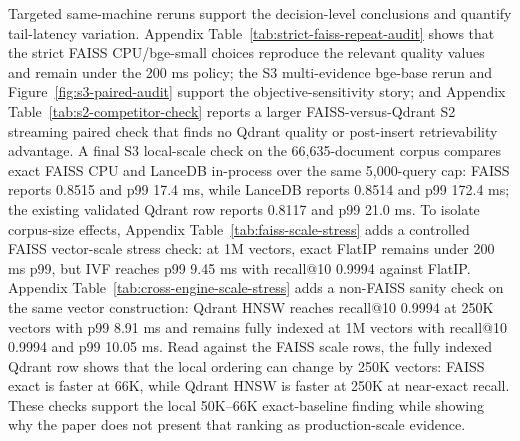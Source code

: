 Targeted same-machine reruns support the decision-level conclusions and quantify tail-latency variation. Appendix Table~\ref{tab:strict-faiss-repeat-audit} shows that the strict FAISS CPU/bge-small choices reproduce the relevant quality values and remain under the 200 ms policy; the S3 multi-evidence bge-base rerun and Figure~\ref{fig:s3-paired-audit} support the objective-sensitivity story; and Appendix Table~\ref{tab:s2-competitor-check} reports a larger FAISS-versus-Qdrant S2 streaming paired check that finds no Qdrant quality or post-insert retrievability advantage. A final S3 local-scale check on the 66{,}635-document \hotpotmaxionbench{} corpus compares exact FAISS CPU and LanceDB in-process over the same 5{,}000-query cap: FAISS reports \ecov{} 0.8515 and p99 17.4 ms, while LanceDB reports \ecov{} 0.8514 and p99 172.4 ms; the existing validated Qdrant row reports \ecov{} 0.8117 and p99 21.0 ms. To isolate corpus-size effects, Appendix Table~\ref{tab:faiss-scale-stress} adds a controlled FAISS vector-scale stress check: at 1M vectors, exact FlatIP remains under 200 ms p99, but IVF reaches p99 9.45 ms with recall@10 0.9994 against FlatIP. Appendix Table~\ref{tab:cross-engine-scale-stress} adds a non-FAISS sanity check on the same vector construction: Qdrant HNSW reaches recall@10 0.9994 at 250K vectors with p99 8.91 ms and remains fully indexed at 1M vectors with recall@10 0.9994 and p99 10.05 ms. Read against the FAISS scale rows, the fully indexed Qdrant row shows that the local ordering can change by 250K vectors: FAISS exact is faster at 66K, while Qdrant HNSW is faster at 250K at near-exact recall. These checks support the local 50K--66K exact-baseline finding while showing why the paper does not present that ranking as production-scale evidence.
